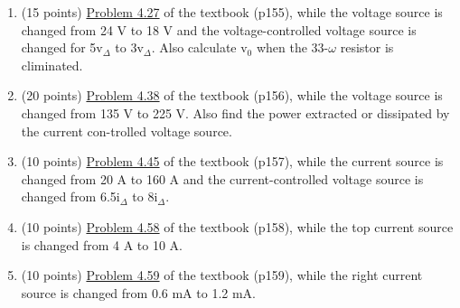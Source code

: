 \documentclass[12pt,a4paper]{article}
\begin{document}
\begin{enumerate}
    
    \item (15 points) \uline{Problem 4.27} of the textbook (p155), while the voltage source is changed from 24 V to 18 V and the voltage-controlled voltage source is changed for 5v${_\Delta}$ to 3v${_\Delta}$. Also calculate v$_0$ when the 33-$\omega$ resistor is climinated.
    \item (20 points) \uline{Problem 4.38} of the textbook (p156), while the voltage source is changed from 135 V to 225 V. Also find the power extracted or dissipated by the current con-trolled voltage source.
    \item (10 points) \uline{Problem 4.45} of the textbook (p157), while the current source is changed from 20 A to 160 A and the current-controlled voltage source is changed from 6.5i${_\Delta}$ to 8i${_\Delta}$.
    \item (10 points) \uline{Problem 4.58} of the textbook (p158), while the top current source is changed from 4 A to 10 A.
    \item (10 points) \uline{Problem 4.59} of the textbook (p159), while the right current source is changed from 0.6 mA to 1.2 mA.



\end{enumerate}
\end{document}
